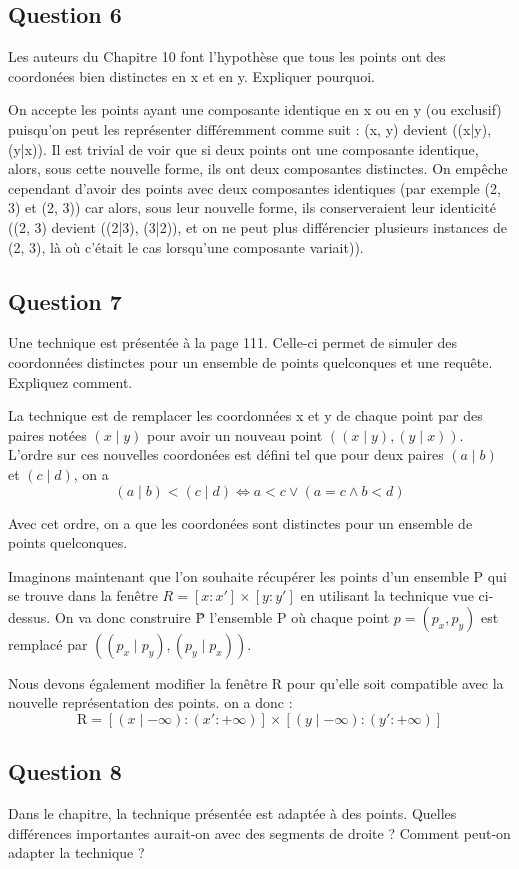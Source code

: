 \documentclass{article}
\newcommand{\gray}{\color{gray}}
\newcommand{\black}{\color{black}}
\begin{document}
\black

\newpage

\subsection{Question 6} Les auteurs du Chapitre 10 font l'hypothèse que tous les points ont des coordonées bien
distinctes en x et en y. Expliquer pourquoi.


\bigskip

\gray
On accepte les points ayant une composante identique en x ou en y (ou exclusif) puisqu'on peut les représenter différemment comme suit : (x, y) devient ((x|y), (y|x)). 
Il est trivial de voir que si deux points ont une composante identique, alors, sous cette nouvelle forme, ils ont deux composantes distinctes. 
On empêche cependant d'avoir des points avec deux composantes identiques (par exemple (2, 3) et (2, 3)) 
car alors, sous leur nouvelle forme, ils conserveraient leur identicité ((2, 3) devient ((2|3), (3|2)), et on ne peut plus différencier plusieurs instances de (2, 3), 
là où c'était le cas lorsqu'une composante variait)).
\black


\subsection{Question 7} Une technique est présentée à la page 111. Celle-ci permet de simuler des coordonnées
distinctes pour un ensemble de points quelconques et une requête. Expliquez comment.


\bigskip

La technique est de remplacer les coordonnées x et y de chaque point par des paires notées $(x \mid y)$ pour avoir un nouveau point $((x \mid y), (y \mid x))$.
L'ordre sur ces nouvelles coordonées est défini tel que pour deux paires $(a \mid b)$ et $(c \mid d)$, on a 
\[
    (a \mid b) < (c \mid d) \iff a < c \lor (a = c \land b < d)  
\]

Avec cet ordre, on a que les coordonées sont distinctes pour un ensemble de points quelconques.

\medskip
Imaginons maintenant que l'on souhaite récupérer les points d'un ensemble P qui se trouve dans la fenêtre $R = [x:x'] \times [y:y']$ 
en utilisant la technique vue ci-dessus. On va donc construire \^P l'ensemble P où chaque point $p = (p_x,p_y)$ est remplacé par $((p_x \mid p_y), (p_y \mid p_x))$.

Nous devons également modifier la fenêtre R pour qu'elle soit compatible avec la nouvelle représentation des points. 
on a donc :
\[
    \text{\^R} = [(x \mid - \infty) : (x':+\infty)] \times [(y \mid - \infty) : (y':+\infty)]   
\]


\subsection{Question 8} Dans le chapitre, la technique présentée est adaptée à des points. 
Quelles différences importantes aurait-on avec des segments de droite ? Comment peut-on adapter la technique ?

\bigskip
\end{document}

